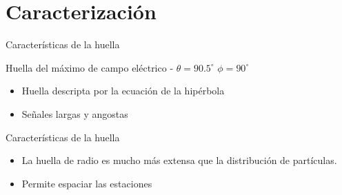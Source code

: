 \section[Caracter\'isticas]{Caracterizaci\'on}

\begin{frame}{Caracter\'isticas de la huella}
\footnotesize
	\begin{block}{Huella del m\'aximo de campo el\'ectrico - $\theta=90.5^\circ$  $\phi=90^\circ$}
		\begin{center}
		\end{center}
	\end{block}
	\begin{alertblock}{}
	 \begin{itemize}
	  \item Huella descripta por la ecuaci\'on de la hip\'erbola
	  \item Se\~nales largas y angostas
	 \end{itemize}
	\end{alertblock}
\end{frame}

\begin{frame}{Caracter\'isticas de la huella}
\footnotesize
	\begin{center}
	\end{center}
	\begin{alertblock}{}
	 \begin{itemize}
	  \item La huella de radio es mucho m\'as extensa que la distribuci\'on de part\'iculas.
	  \item Permite espaciar las estaciones
	 \end{itemize}
	\end{alertblock}
\end{frame}




